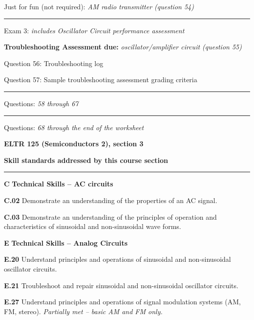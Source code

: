 \hskip 10pt Just for fun (not required): {\it AM radio transmitter (question 54)}
 

\vskip 10pt
\hrule \vskip 5pt
\noindent
{}

\hskip 10pt Exam 3: {\it includes Oscillator Circuit performance assessment}
 
\hskip 10pt {\bf Troubleshooting Assessment due:} {\it oscillator/amplifier circuit (question 55)}
 
\hskip 10pt Question 56: Troubleshooting log
 
\hskip 10pt Question 57: Sample troubleshooting assessment grading criteria
 
\vskip 10pt
\hrule \vskip 5pt
\noindent
{}

\hskip 10pt Questions: {\it 58 through 67}
 
\vskip 10pt
\hrule \vskip 5pt
\noindent
{}

\hskip 10pt Questions: {\it 68 through the end of the worksheet}
 
\vskip 10pt





\vfil \eject

\centerline{\bf ELTR 125 (Semiconductors 2), section 3} \bigskip 
 
\vskip 10pt

\noindent
{\bf Skill standards addressed by this course section}

\vskip 5pt

\hrule \vskip 10pt
\noindent
{}

\vskip 5pt

\item{\bf C} {\bf Technical Skills -- AC circuits}
\item{\bf C.02} Demonstrate an understanding of the properties of an AC signal.
\item{\bf C.03} Demonstrate an understanding of the principles of operation and characteristics of sinusoidal and non-sinusoidal wave forms.

\vskip 5pt

\medskip
\item{\bf E} {\bf Technical Skills -- Analog Circuits}
\item{\bf E.20} Understand principles and operations of sinusoidal and non-sinusoidal oscillator circuits.
\item{\bf E.21} Troubleshoot and repair sinusoidal and non-sinusoidal oscillator circuits.
\item{\bf E.27} Understand principles and operations of signal modulation systems (AM, FM, stereo).  {\it Partially met -- basic AM and FM only.}
\medskip

